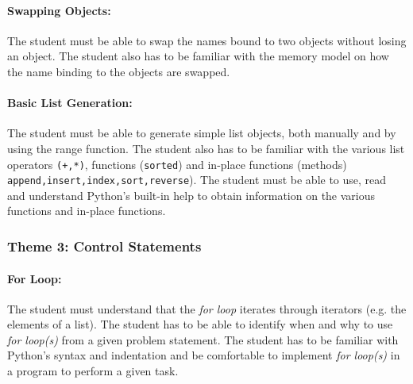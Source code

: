             \paragraph{Swapping Objects:}
            The student must be able to swap the names bound to two objects without
            losing an object. The student also has to be
            familiar with the memory model on how the name binding
            to the objects are swapped.

            \paragraph{Basic List Generation:}
            The student must be able to generate simple list objects,
            both manually and by using the range function. The student
            also has to be familiar with the various list operators
            \texttt{(+,*)}, functions (\texttt{sorted}) and in-place
            functions (methods)
            \texttt{append,insert,index,sort,reverse}).  The student
            must be able to use, read and understand Python's built-in
            help to obtain information on the various functions and
            in-place functions.

        \subsubsection{Theme 3: Control Statements}
            \paragraph{For Loop:}
            The student must understand that the \textit{for loop}
            iterates through iterators (e.g. the elements of a
            list). The student has to be able to identify when and why
            to use \textit{for loop(s)} from a given problem
            statement. The student has to be familiar with Python's
            syntax and indentation and be comfortable to implement
            \textit{for loop(s)} in a program to perform a given task.

